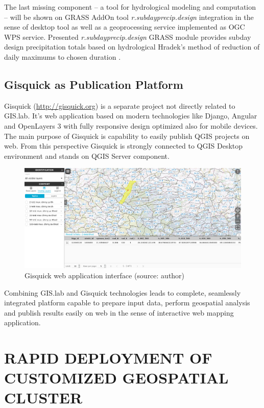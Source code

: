 \documentclass{isprs}
\begin{document}
The last missing component -- a tool for hydrological modeling and
computation -- will be shown on GRASS AddOn tool
\textit{r.subdayprecip.design} integration in the sense of desktop
tool as well as a geoprocessing service implemented as OGC WPS
service. Presented \textit{r.subdayprecip.design} GRASS module
provides subday design precipitation totals based on hydrological
Hradek's method of reduction of daily maximums to chosen duration
\cite{landa.2015:FOSS4GE2015}.

\subsection{Gisquick as Publication Platform}

Gisquick (\url{http://gisquick.org}) is a separate project not
directly related to GIS.lab. It's web application based on modern
technologies like Django, Angular and OpenLayers 3 with fully
responsive design optimized also for mobile devices. The main purpose
of Gisquick is capability to easily publish QGIS projects on web. From
this perspective Gisquick is strongly connected to QGIS Desktop
environment and stands on QGIS Server component.

\begin{figure}[ht!]
\begin{center}
  \includegraphics[width=0.9\columnwidth]{figures/gisquick-identify.png}
  \caption{Gisquick web application interface
    (source: author)}
\label{fig:gislab_infrastructure}
\end{center}
\end{figure}

Combining GIS.lab and Gisquick technologies leads to complete, seamlessly
integrated platform capable to prepare input data, perform geospatial
analysis and publish results easily on web in the sense of interactive
web mapping application.

\section{RAPID DEPLOYMENT OF CUSTOMIZED GEOSPATIAL CLUSTER}
\end{document}
